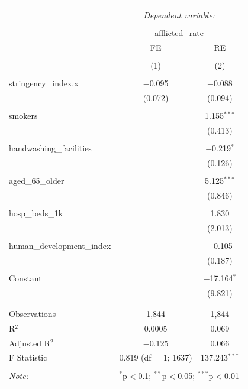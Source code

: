 \documentclass[11pt,preprint, authoryear]{elsarticle}
\let\origtable\table
\let\endorigtable\endtable
\renewenvironment{table}[1][2] {
    \expandafter\origtable\expandafter[H]
} {
    \endorigtable
}
\numberwithin{equation}{section}
\numberwithin{figure}{section}
\numberwithin{table}{section}
\begin{document}
\begin{table}[!htbp] \centering 
  \caption{} 
  \label{} 
\small 
\begin{tabular}{@{\extracolsep{5pt}}lcc} 
\\[-1.8ex]\hline 
\hline \\[-1.8ex] 
 & \multicolumn{2}{c}{\textit{Dependent variable:}} \\ 
\cline{2-3} 
\\[-1.8ex] & \multicolumn{2}{c}{afflicted\_rate} \\ 
 & FE & RE \\ 
\\[-1.8ex] & (1) & (2)\\ 
\hline \\[-1.8ex] 
 stringency\_index.x & $-$0.095 & $-$0.088 \\ 
  & (0.072) & (0.094) \\ 
  & & \\ 
 smokers &  & 1.155$^{***}$ \\ 
  &  & (0.413) \\ 
  & & \\ 
 handwashing\_facilities &  & $-$0.219$^{*}$ \\ 
  &  & (0.126) \\ 
  & & \\ 
 aged\_65\_older &  & 5.125$^{***}$ \\ 
  &  & (0.846) \\ 
  & & \\ 
 hosp\_beds\_1k &  & 1.830 \\ 
  &  & (2.013) \\ 
  & & \\ 
 human\_development\_index &  & $-$0.105 \\ 
  &  & (0.187) \\ 
  & & \\ 
 Constant &  & $-$17.164$^{*}$ \\ 
  &  & (9.821) \\ 
  & & \\ 
\hline \\[-1.8ex] 
Observations & 1,844 & 1,844 \\ 
R$^{2}$ & 0.0005 & 0.069 \\ 
Adjusted R$^{2}$ & $-$0.125 & 0.066 \\ 
F Statistic & 0.819 (df = 1; 1637) & 137.243$^{***}$ \\ 
\hline 
\hline \\[-1.8ex] 
\textit{Note:}  & \multicolumn{2}{r}{$^{*}$p$<$0.1; $^{**}$p$<$0.05; $^{***}$p$<$0.01} \\ 
\end{tabular} 
\end{table}
\end{document}
